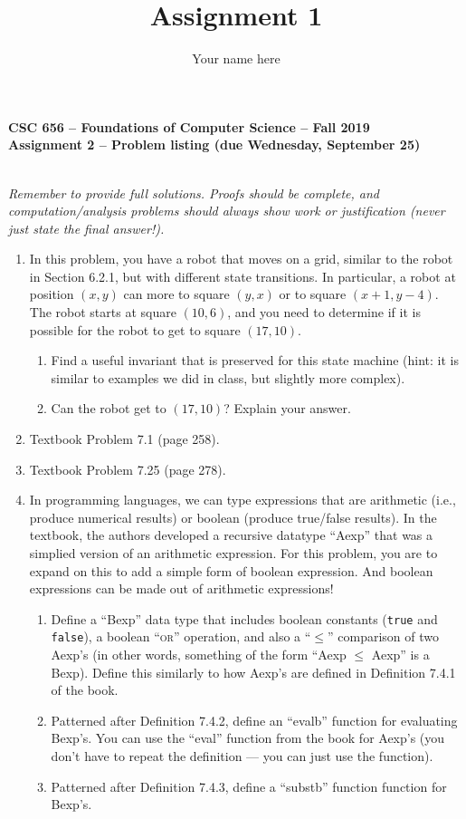 \documentclass[11pt]{article}
\title{Assignment 1}
\author{Your name here}
\date{}
\begin{document}
\begin{center}
  {\Large\textbf{CSC 656 -- Foundations of Computer Science -- Fall 2019}}\\
  {\large\textbf{Assignment 2 -- Problem listing (due Wednesday, September 25)}}
\end{center}

\ \\

\noindent
\textsl{Remember to provide full solutions. Proofs should be complete,
  and computation/analysis problems should always show work or
  justification (never just state the final answer!).}

\begin{enumerate}
\item In this problem, you have a robot that moves on a grid, similar
  to the robot in Section 6.2.1, but with different state
  transitions. In particular, a robot at position $(x,y)$ can more to
  square $(y,x)$ or to square $(x+1,y-4)$. The robot starts at square
  $(10,6)$, and you need to determine if it is possible for the robot
  to get to square $(17,10)$.
  \begin{enumerate}
    \item Find a useful invariant that is preserved for this state
      machine (hint: it is similar to examples we did in class, but
      slightly more complex).
    \item Can the robot get to $(17,10)$?  Explain your answer.
  \end{enumerate}
  
\item Textbook Problem 7.1 (page 258).

\item Textbook Problem 7.25 (page 278).

\item In programming languages, we can type expressions that are
  arithmetic (i.e., produce numerical results) or boolean (produce
  true/false results). In the textbook, the authors developed a recursive
  datatype ``Aexp'' that was a simplied version of an arithmetic
  expression. For this problem, you are to expand on this to add a
  simple form of boolean expression. And boolean expressions can be
  made out of arithmetic expressions!
  \begin{enumerate}
    \item Define a ``Bexp'' data type that includes boolean constants
      (\texttt{true} and \texttt{false}), a boolean
      ``\textsc{or}'' operation, and also a ``$\leq$''
      comparison of two Aexp's  (in other words, something of the form
      ``Aexp $\leq$ Aexp'' is a Bexp). Define this similarly to how
      Aexp's are defined in Definition 7.4.1 of the book.
    \item Patterned after Definition 7.4.2, define an ``evalb''
      function for evaluating Bexp's. You can use the ``eval''
      function from the book for Aexp's (you don't have to
      repeat the definition --- you can just use the function).
    \item Patterned after Definition 7.4.3, define a ``substb''
      function function for Bexp's.
  \end{enumerate}


\end{enumerate}
\end{document}
